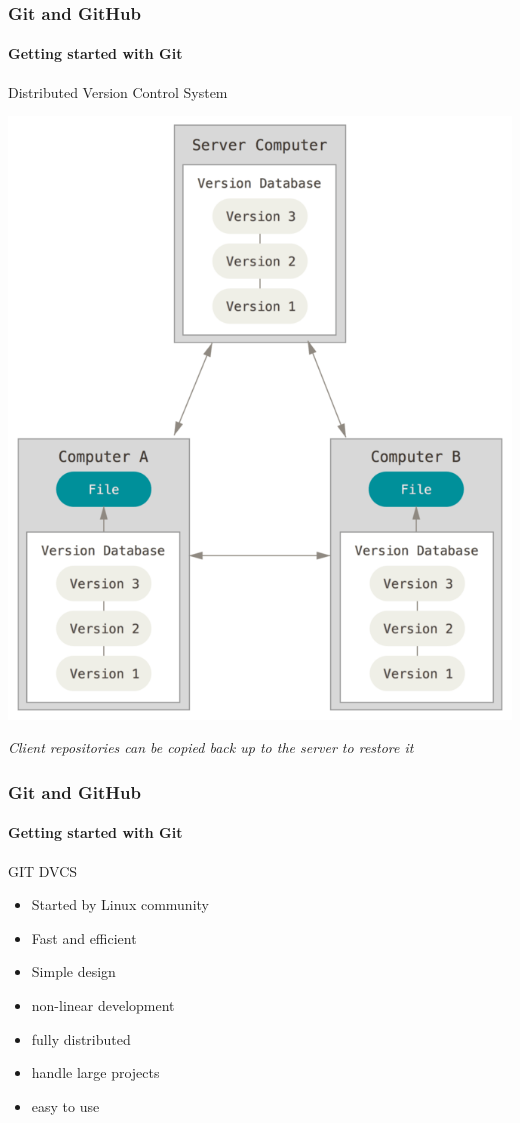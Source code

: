 \begin{frame}
    \frametitle{Git and GitHub}
    \framesubtitle{Getting started with Git}
    \addtocounter{nframe}{1}
    
    \begin{block}{Distributed Version Control System}
        \begin{center}

            \includegraphics[width=.7\textwidth]{imgs/distributed.png}
    
        \end{center}
    
    \end{block}

    \textit{Client repositories can be copied back up to the server to restore it}

\end{frame}

\begin{frame}
    \frametitle{Git and GitHub}
    \framesubtitle{Getting started with Git}
    \addtocounter{nframe}{1}
    
    \begin{block}{GIT DVCS}
       \begin{itemize}
           \item Started by Linux community
           \item Fast and efficient 
           \item Simple design
           \item non-linear development
           \item fully distributed
           \item handle large projects
           \item easy to use
       \end{itemize}
    
    \end{block}

\end{frame}


